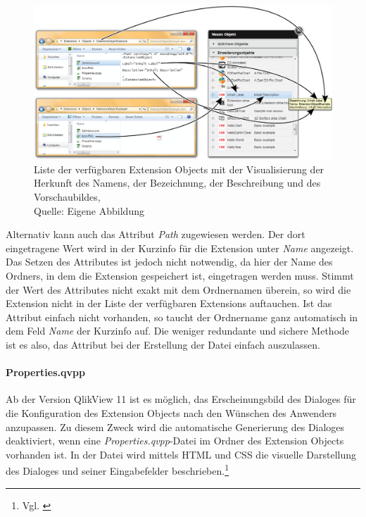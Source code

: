 \ifIncludeFigures\begin{figure}[htbp]
	\centering
		\includegraphics[width=1.00\textwidth]{./img/DefUndIcon/DefUndIcon2.png}
	\caption[Liste der verfügbaren Extension Objects]{Liste der verfügbaren Extension Objects mit der Visualisierung der Herkunft des Namens, der Bezeichnung, der Beschreibung und des Vorschaubildes, \\Quelle: Eigene Abbildung}
	\label{fig:DefUndIcon2}
\end{figure}\fi

Alternativ kann auch das Attribut \textit{Path} zugewiesen werden. Der dort eingetragene Wert wird in der Kurzinfo für die Extension unter \textit{Name} angezeigt. Das Setzen des Attributes ist jedoch nicht notwendig, da hier der Name des Ordners, in dem die Extension gespeichert ist, eingetragen werden muss. Stimmt der Wert des Attributes nicht exakt mit dem Ordnernamen überein, so wird die Extension nicht in der Liste der verfügbaren Extensions auftauchen. Ist das Attribut einfach nicht vorhanden, so taucht der Ordnername ganz automatisch in dem Feld \textit{Name} der Kurzinfo auf. Die weniger redundante und sichere Methode ist es also, das Attribut bei der Erstellung der Datei einfach auszulassen.




\paragraph{Properties.qvpp}
\label{lab:PropertiesQvpp} 

Ab der Version QlikView 11 ist es möglich, das Erscheinungs\-bild des Dialoges für die Konfiguration des Extension Objects nach den Wünschen des Anwenders anzupassen. Zu diesem Zweck wird die automatische Generierung des Dialoges deaktiviert, wenn eine \textit{Properties.qvpp}-Datei im Ordner des Extension Objects vorhanden ist. In der Datei wird mittels HTML und CSS die visuelle Darstellung des Dialoges und seiner Eingabefelder beschrieben.\footnote{Vgl. \cite{QlikViewPropertiesPages}}

